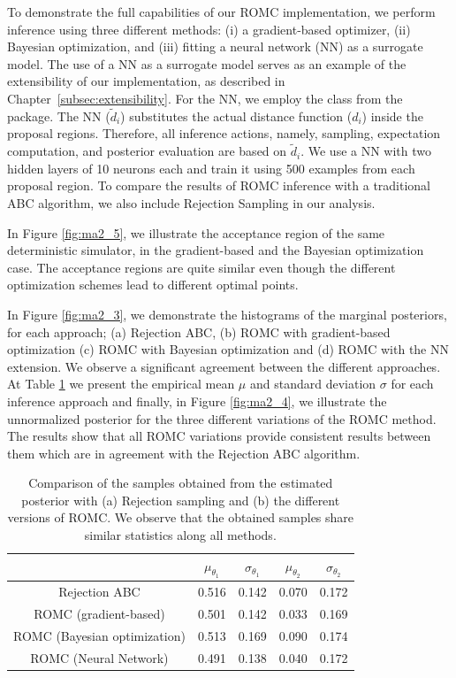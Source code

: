 \documentclass[nojss]{jss}
\begin{document}
To demonstrate the full capabilities of our ROMC implementation, we
perform inference using three different methods: (i) a gradient-based
optimizer, (ii) Bayesian optimization, and (iii) fitting a neural
network (NN) as a surrogate model. The use of a NN as a surrogate
model serves as an example of the extensibility of our implementation,
as described in Chapter~\ref{subsec:extensibility}. For the NN, we
employ the  class from the 
package. The NN (\(\tilde{d}_i\)) substitutes the actual distance
function (\(d_i\)) inside the proposal regions. Therefore, all
inference actions, namely, sampling, expectation computation, and
posterior evaluation are based on \(\tilde{d}_i\). We use a NN with
two hidden layers of 10 neurons each and train it using 500 examples
from each proposal region. To compare the results of ROMC inference
with a traditional ABC algorithm, we also include Rejection Sampling
in our analysis.

In Figure \ref{fig:ma2_5}, we illustrate the acceptance region of the
same deterministic simulator, in the gradient-based and the Bayesian
optimization case. The acceptance regions are quite similar even though the
different optimization schemes lead to different optimal points.

In Figure \ref{fig:ma2_3}, we demonstrate the histograms of the
marginal posteriors, for each approach; (a) Rejection ABC, (b) ROMC
with gradient-based optimization (c) ROMC with Bayesian optimization
and (d) ROMC with the NN extension. We observe a significant agreement
between the different approaches. At Table \ref{tab:ma2} we present
the empirical mean \(\mu\) and standard deviation \(\sigma\) for each
inference approach and finally, in Figure \ref{fig:ma2_4}, we
illustrate the unnormalized posterior for the three different
variations of the ROMC method. The results show that all ROMC
variations provide consistent results between them which are in
agreement with the Rejection ABC algorithm.

\begin{table}
\begin{center}
\begin{tabular}{ c|c|c|c|c }
\hline
& \(\mu_{\theta_1}\) & \(\sigma_{\theta_1}\) & \(\mu_{\theta_2}\) & \(\sigma_{\theta_2}\) \\
\hline \hline
Rejection ABC & 0.516 & 0.142 & 0.070 & 0.172 \\
\hline
ROMC (gradient-based) & 0.501 & 0.142 & 0.033 & 0.169 \\
\hline
ROMC (Bayesian optimization) & 0.513 & 0.169 & 0.090 & 0.174 \\
\hline
ROMC (Neural Network) & 0.491 & 0.138 & 0.040 & 0.172 \\
\hline
\end{tabular}
\end{center}
\caption{Comparison of the samples obtained from the estimated
  posterior with (a) Rejection sampling and (b) the different versions
  of ROMC. We observe that the obtained samples share similar
  statistics along all methods. \label{tab:ma2}}
\end{table}
\end{document}
